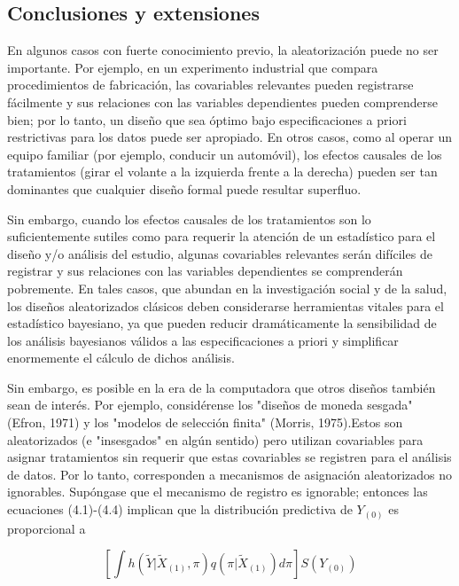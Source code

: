 \documentclass[12pt,a4paper]{article}
\begin{document}
{{\subsection{Conclusiones y extensiones}

En algunos casos con fuerte conocimiento previo, la aleatorización puede no ser importante.  Por ejemplo, en un experimento industrial que compara procedimientos de fabricación, las covariables relevantes pueden registrarse fácilmente y sus relaciones con las variables dependientes pueden comprenderse bien; por lo tanto, un diseño que sea óptimo bajo especificaciones a priori restrictivas para los datos puede ser apropiado. En otros casos, como al operar un equipo familiar (por ejemplo, conducir un automóvil), los efectos causales de los tratamientos (girar el volante a la izquierda frente a la derecha) pueden ser tan dominantes que cualquier diseño formal puede resultar superfluo. 

Sin embargo, cuando los efectos causales de los tratamientos son lo suficientemente sutiles como para requerir la atención de un estadístico para el diseño y/o análisis del estudio, algunas covariables relevantes serán difíciles de registrar y sus relaciones con las variables dependientes se comprenderán pobremente. En tales casos, que abundan en la investigación social y de la salud, los diseños aleatorizados clásicos deben considerarse herramientas vitales para el estadístico bayesiano, ya que pueden reducir dramáticamente la sensibilidad de los análisis bayesianos válidos a las especificaciones a priori y simplificar enormemente el cálculo de dichos análisis. 

Sin embargo, es posible en la era de la computadora que otros diseños también sean de interés. Por ejemplo, considérense los "diseños de moneda sesgada" (Efron, 1971) y los "modelos de selección finita" (Morris, 1975).Estos son aleatorizados (e "insesgados" en algún sentido) pero utilizan covariables para asignar tratamientos sin requerir que estas covariables se registren para el análisis de datos. Por lo tanto, corresponden a mecanismos de asignación aleatorizados no ignorables.  Supóngase que el mecanismo de registro es ignorable; entonces las ecuaciones (4.1)-(4.4) implican que la distribución predictiva de $Y_{(0)}$ es proporcional a 

\begin{equation}\label{eq:5.1}
\left[ \int h(\tilde{Y}|\tilde{X}_{(1)},\pi)q(\pi|\tilde{X}_{(1)})d\pi \right] S(Y_{(0)}) \tag{5.1}
\end{equation} 

}}
\end{document}
